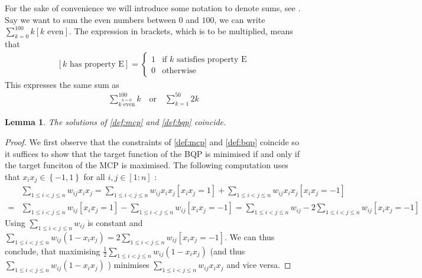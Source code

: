 \documentclass[12pt,a4paper]{article}
\theoremstyle{mythm}
\newtheorem{lem}[thm]{Lemma}
\begin{document}
For the sake of convenience we will introduce some notation to denote sums, see \cite[p. 41]{Aigner2007}. Say we want to sum the even numbers between $ 0 $ and $ 100 $, we can
write $ \sum_{ k = 0 }^{ 100 } k \left[ k \text{ even}  \right]  $. The expression in brackets, which is to be multiplied, means that 
\begin{align*}
\left[ k \text{ has property E}  \right] = 
\begin{cases}
1 & \text{if } k \text{ satisfies property E} \\
0 & \text{otherwise} 
\end{cases}
\end{align*} 
This expresses the same sum as 
\begin{align*}
\sum_{ \overset{ k = 0 }{ k \text{ even} }   }^{ 100 } k \quad \text{or} \quad \sum_{ k = 1 }^{ 50 } 2k
\end{align*} 
\begin{lem}
\label{lem:01}
The solutions of \ref{def:mcp} and \ref{def:bqp} coincide.
\end{lem} 
\begin{proof}
We first observe that the constraints of \ref{def:mcp} and \ref{def:bqp} coincide so it suffices to show that the target function of the BQP is minimised if and only if the
target funciton of the MCP is maximised. The following computation uses that $ x_i x_j \in \left\{-1,1\right\}$ for all $ i,j \in \left[ 1 : n \right]  $ :
\begin{align*}
&\sum_{ 1 \leq i < j \leq n    }^{  } w _{ ij } x_i x_j 
= \sum_{  1 \leq i < j \leq n  }^{  } w _{ ij } x_i x_j \left[ x_i x_j = 1 \right]  + \sum_{ 1 \leq i < j \leq n    }^{  } w _{ ij } x_i x_j \left[ x_i x_j = -1\right] \\
=& \sum_{  1 \leq i < j \leq n  }^{  } w _{ ij } \left[ x_i x_j = 1 \right]  - \sum_{ 1 \leq i < j \leq n    }^{  } w _{ ij } \left[ x_i x_j = -1\right] 
= \sum_{  1 \leq i < j \leq n  }^{  } w _{ ij }   - 2\sum_{ 1 \leq i < j \leq n    }^{  } w _{ ij } \left[ x_i x_j = -1\right]
\end{align*} 
Using $ \sum_{ 1 \leq i < j \leq n    }^{  } w _{ ij }  $ is constant and $ \sum_{ 1 \leq i < j \leq n    }^{  } w _{ ij } (1 - x_i x_j) = 2 \sum_{ 1 \leq i < j \leq n    }^{  }
w _{ ij } \left[  x_i x_j = -1\right]  $. 
We can thus conclude, that maximising $ \frac{ 1 }{ 2 } \sum_{  1 \leq i < j \leq n   }^{  } w _{ ij } (1 - x_i x_j) $ (and thus $ \sum_{  1 \leq
i < j \leq n   }^{  } w _{ ij } (1 - x_i x_j) $ ) minimises $ \sum_{ 1 \leq i < j \leq n    }^{  } w _{ ij } x_i x_j $ and vice versa.
\end{proof}
\end{document}
